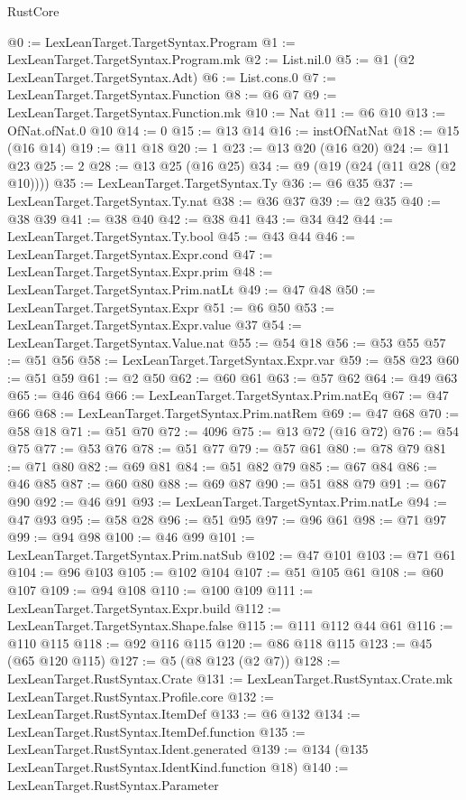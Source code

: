 \begin{lexlean}{RustCore}
\begin{coremodule}
@0 := LexLeanTarget.TargetSyntax.Program
@1 := LexLeanTarget.TargetSyntax.Program.mk
@2 := List.nil.{0}
@5 := @1 (@2 LexLeanTarget.TargetSyntax.Adt)
@6 := List.cons.{0}
@7 := LexLeanTarget.TargetSyntax.Function
@8 := @6 @7
@9 := LexLeanTarget.TargetSyntax.Function.mk
@10 := Nat
@11 := @6 @10
@13 := OfNat.ofNat.{0} @10
@14 := 0
@15 := @13 @14
@16 := instOfNatNat
@18 := @15 (@16 @14)
@19 := @11 @18
@20 := 1
@23 := @13 @20 (@16 @20)
@24 := @11 @23
@25 := 2
@28 := @13 @25 (@16 @25)
@34 := @9 (@19 (@24 (@11 @28 (@2 @10))))
@35 := LexLeanTarget.TargetSyntax.Ty
@36 := @6 @35
@37 := LexLeanTarget.TargetSyntax.Ty.nat
@38 := @36 @37
@39 := @2 @35
@40 := @38 @39
@41 := @38 @40
@42 := @38 @41
@43 := @34 @42
@44 := LexLeanTarget.TargetSyntax.Ty.bool
@45 := @43 @44
@46 := LexLeanTarget.TargetSyntax.Expr.cond
@47 := LexLeanTarget.TargetSyntax.Expr.prim
@48 := LexLeanTarget.TargetSyntax.Prim.natLt
@49 := @47 @48
@50 := LexLeanTarget.TargetSyntax.Expr
@51 := @6 @50
@53 := LexLeanTarget.TargetSyntax.Expr.value @37
@54 := LexLeanTarget.TargetSyntax.Value.nat
@55 := @54 @18
@56 := @53 @55
@57 := @51 @56
@58 := LexLeanTarget.TargetSyntax.Expr.var
@59 := @58 @23
@60 := @51 @59
@61 := @2 @50
@62 := @60 @61
@63 := @57 @62
@64 := @49 @63
@65 := @46 @64
@66 := LexLeanTarget.TargetSyntax.Prim.natEq
@67 := @47 @66
@68 := LexLeanTarget.TargetSyntax.Prim.natRem
@69 := @47 @68
@70 := @58 @18
@71 := @51 @70
@72 := 4096
@75 := @13 @72 (@16 @72)
@76 := @54 @75
@77 := @53 @76
@78 := @51 @77
@79 := @57 @61
@80 := @78 @79
@81 := @71 @80
@82 := @69 @81
@84 := @51 @82 @79
@85 := @67 @84
@86 := @46 @85
@87 := @60 @80
@88 := @69 @87
@90 := @51 @88 @79
@91 := @67 @90
@92 := @46 @91
@93 := LexLeanTarget.TargetSyntax.Prim.natLe
@94 := @47 @93
@95 := @58 @28
@96 := @51 @95
@97 := @96 @61
@98 := @71 @97
@99 := @94 @98
@100 := @46 @99
@101 := LexLeanTarget.TargetSyntax.Prim.natSub
@102 := @47 @101
@103 := @71 @61
@104 := @96 @103
@105 := @102 @104
@107 := @51 @105 @61
@108 := @60 @107
@109 := @94 @108
@110 := @100 @109
@111 := LexLeanTarget.TargetSyntax.Expr.build
@112 := LexLeanTarget.TargetSyntax.Shape.false
@115 := @111 @112 @44 @61
@116 := @110 @115
@118 := @92 @116 @115
@120 := @86 @118 @115
@123 := @45 (@65 @120 @115)
@127 := @5 (@8 @123 (@2 @7))
@128 := LexLeanTarget.RustSyntax.Crate
@131 := LexLeanTarget.RustSyntax.Crate.mk LexLeanTarget.RustSyntax.Profile.core
@132 := LexLeanTarget.RustSyntax.ItemDef
@133 := @6 @132
@134 := LexLeanTarget.RustSyntax.ItemDef.function
@135 := LexLeanTarget.RustSyntax.Ident.generated
@139 := @134 (@135 LexLeanTarget.RustSyntax.IdentKind.function @18)
@140 := LexLeanTarget.RustSyntax.Parameter

\end{coremodule}
\end{lexlean}
